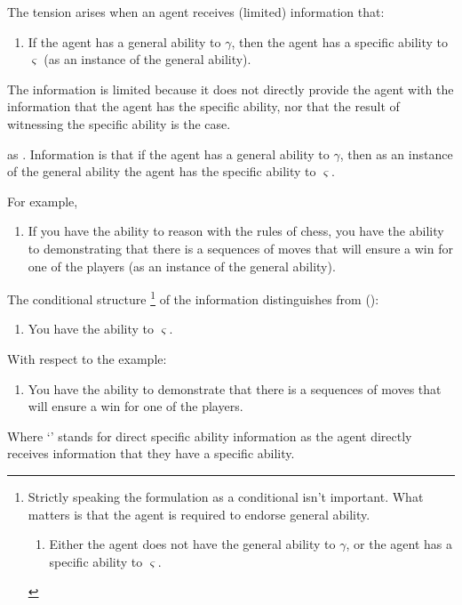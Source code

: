 \begin{note}
  The tension arises when an agent receives (limited) information that:
  \begin{enumerate}[label=(\GSI{}), ref=(\GSI{})]
  \item If the agent has a general ability to \(\gamma\), then the agent has a specific ability to \(\varsigma\) (as an instance of the general ability).
  \end{enumerate}
  The information is limited because it does not directly provide the agent with the information that the agent has the specific ability, nor that the result of witnessing the specific ability is the case.

  \GSI{} as \gsi{}.
  Information is that if the agent has a general ability to \(\gamma\), then as an instance of the general ability the agent has the specific ability to \(\varsigma\).

  For example,
  \begin{enumerate}[label=(\GSI{}\arabic*), ref=(\GSI{}\arabic*)]
  \item\label{qe:cond} If you have the ability to reason with the rules of chess, you have the ability to demonstrating that there is a sequences of moves that will ensure a win for one of the players (as an instance of the general ability).
  \end{enumerate}
  The conditional structure\nolinebreak
  \footnote{
    Strictly speaking the formulation as a conditional isn't important.
    What matters is that the agent is required to endorse general ability.
    \begin{enumerate}[label=(\GSI{}\('\)), ref=(\GSI{}\('\))]
    \item Either the agent does not have the general ability to \(\gamma\), or the agent has a specific ability to \(\varsigma\).
    \end{enumerate}
  }
  of the information distinguishes \GSI{} from (\dSI{}):
  \begin{enumerate}[label=(\dSI{}), ref=(\dSI{})]
  \item You have the ability to \(\varsigma\).
  \end{enumerate}
  With respect to the example:
  \begin{enumerate}[label=(\dSI{}\arabic*), ref=(\dSI{}\arabic*)]
  \item\label{qe:cons} You have the ability to demonstrate that there is a sequences of moves that will ensure a win for one of the players.
  \end{enumerate}
  Where `\dSI{}' stands for direct specific ability information as the agent directly receives information that they have a specific ability.


\end{note}
